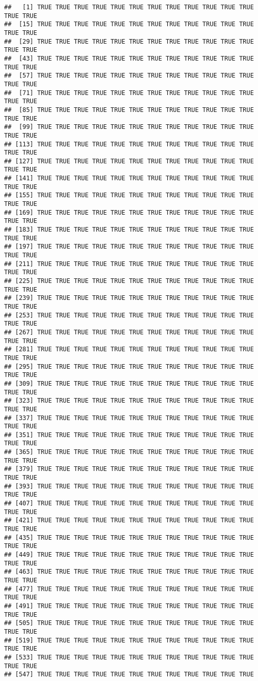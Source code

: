 \documentclass[]{article}
\begin{document}
\begin{verbatim}
##   [1] TRUE TRUE TRUE TRUE TRUE TRUE TRUE TRUE TRUE TRUE TRUE TRUE TRUE TRUE
##  [15] TRUE TRUE TRUE TRUE TRUE TRUE TRUE TRUE TRUE TRUE TRUE TRUE TRUE TRUE
##  [29] TRUE TRUE TRUE TRUE TRUE TRUE TRUE TRUE TRUE TRUE TRUE TRUE TRUE TRUE
##  [43] TRUE TRUE TRUE TRUE TRUE TRUE TRUE TRUE TRUE TRUE TRUE TRUE TRUE TRUE
##  [57] TRUE TRUE TRUE TRUE TRUE TRUE TRUE TRUE TRUE TRUE TRUE TRUE TRUE TRUE
##  [71] TRUE TRUE TRUE TRUE TRUE TRUE TRUE TRUE TRUE TRUE TRUE TRUE TRUE TRUE
##  [85] TRUE TRUE TRUE TRUE TRUE TRUE TRUE TRUE TRUE TRUE TRUE TRUE TRUE TRUE
##  [99] TRUE TRUE TRUE TRUE TRUE TRUE TRUE TRUE TRUE TRUE TRUE TRUE TRUE TRUE
## [113] TRUE TRUE TRUE TRUE TRUE TRUE TRUE TRUE TRUE TRUE TRUE TRUE TRUE TRUE
## [127] TRUE TRUE TRUE TRUE TRUE TRUE TRUE TRUE TRUE TRUE TRUE TRUE TRUE TRUE
## [141] TRUE TRUE TRUE TRUE TRUE TRUE TRUE TRUE TRUE TRUE TRUE TRUE TRUE TRUE
## [155] TRUE TRUE TRUE TRUE TRUE TRUE TRUE TRUE TRUE TRUE TRUE TRUE TRUE TRUE
## [169] TRUE TRUE TRUE TRUE TRUE TRUE TRUE TRUE TRUE TRUE TRUE TRUE TRUE TRUE
## [183] TRUE TRUE TRUE TRUE TRUE TRUE TRUE TRUE TRUE TRUE TRUE TRUE TRUE TRUE
## [197] TRUE TRUE TRUE TRUE TRUE TRUE TRUE TRUE TRUE TRUE TRUE TRUE TRUE TRUE
## [211] TRUE TRUE TRUE TRUE TRUE TRUE TRUE TRUE TRUE TRUE TRUE TRUE TRUE TRUE
## [225] TRUE TRUE TRUE TRUE TRUE TRUE TRUE TRUE TRUE TRUE TRUE TRUE TRUE TRUE
## [239] TRUE TRUE TRUE TRUE TRUE TRUE TRUE TRUE TRUE TRUE TRUE TRUE TRUE TRUE
## [253] TRUE TRUE TRUE TRUE TRUE TRUE TRUE TRUE TRUE TRUE TRUE TRUE TRUE TRUE
## [267] TRUE TRUE TRUE TRUE TRUE TRUE TRUE TRUE TRUE TRUE TRUE TRUE TRUE TRUE
## [281] TRUE TRUE TRUE TRUE TRUE TRUE TRUE TRUE TRUE TRUE TRUE TRUE TRUE TRUE
## [295] TRUE TRUE TRUE TRUE TRUE TRUE TRUE TRUE TRUE TRUE TRUE TRUE TRUE TRUE
## [309] TRUE TRUE TRUE TRUE TRUE TRUE TRUE TRUE TRUE TRUE TRUE TRUE TRUE TRUE
## [323] TRUE TRUE TRUE TRUE TRUE TRUE TRUE TRUE TRUE TRUE TRUE TRUE TRUE TRUE
## [337] TRUE TRUE TRUE TRUE TRUE TRUE TRUE TRUE TRUE TRUE TRUE TRUE TRUE TRUE
## [351] TRUE TRUE TRUE TRUE TRUE TRUE TRUE TRUE TRUE TRUE TRUE TRUE TRUE TRUE
## [365] TRUE TRUE TRUE TRUE TRUE TRUE TRUE TRUE TRUE TRUE TRUE TRUE TRUE TRUE
## [379] TRUE TRUE TRUE TRUE TRUE TRUE TRUE TRUE TRUE TRUE TRUE TRUE TRUE TRUE
## [393] TRUE TRUE TRUE TRUE TRUE TRUE TRUE TRUE TRUE TRUE TRUE TRUE TRUE TRUE
## [407] TRUE TRUE TRUE TRUE TRUE TRUE TRUE TRUE TRUE TRUE TRUE TRUE TRUE TRUE
## [421] TRUE TRUE TRUE TRUE TRUE TRUE TRUE TRUE TRUE TRUE TRUE TRUE TRUE TRUE
## [435] TRUE TRUE TRUE TRUE TRUE TRUE TRUE TRUE TRUE TRUE TRUE TRUE TRUE TRUE
## [449] TRUE TRUE TRUE TRUE TRUE TRUE TRUE TRUE TRUE TRUE TRUE TRUE TRUE TRUE
## [463] TRUE TRUE TRUE TRUE TRUE TRUE TRUE TRUE TRUE TRUE TRUE TRUE TRUE TRUE
## [477] TRUE TRUE TRUE TRUE TRUE TRUE TRUE TRUE TRUE TRUE TRUE TRUE TRUE TRUE
## [491] TRUE TRUE TRUE TRUE TRUE TRUE TRUE TRUE TRUE TRUE TRUE TRUE TRUE TRUE
## [505] TRUE TRUE TRUE TRUE TRUE TRUE TRUE TRUE TRUE TRUE TRUE TRUE TRUE TRUE
## [519] TRUE TRUE TRUE TRUE TRUE TRUE TRUE TRUE TRUE TRUE TRUE TRUE TRUE TRUE
## [533] TRUE TRUE TRUE TRUE TRUE TRUE TRUE TRUE TRUE TRUE TRUE TRUE TRUE TRUE
## [547] TRUE TRUE TRUE TRUE TRUE TRUE TRUE TRUE TRUE TRUE TRUE TRUE
\end{verbatim}
\end{document}
